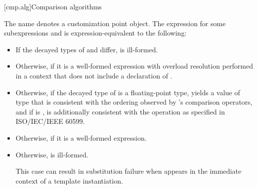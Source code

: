 [cmp.alg]{Comparison algorithms}

%
\pnum
The name  denotes
a customization point object.
The expression 
for some subexpressions  and 
is expression-equivalent to the following:
\begin{itemize}
\item
  If the decayed types of  and  differ,
   is ill-formed.
\item
  Otherwise, 
  if it is a well-formed expression
  with overload resolution performed in a context
  that does not include a declaration of .
\item
  Otherwise, if the decayed type  of  is
  a floating-point type,
  yields a value of type 
  that is consistent with the ordering
  observed by ’s comparison operators, and
  if  is ,
  is additionally consistent with the  operation
  as specified in ISO/IEC/IEEE 60599.
\item
  Otherwise,  if it is a well-formed expression.
\item
  Otherwise,  is ill-formed.
  \begin{note}
  This case can result in substitution failure
  when  appears in the immediate context
  of a template instantiation.
  \end{note}
\end{itemize}

